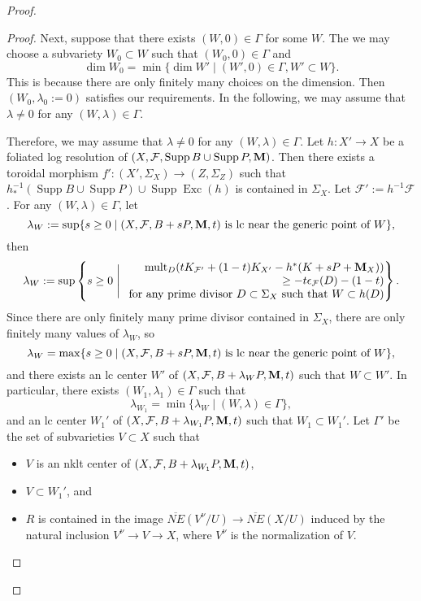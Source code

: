 \documentclass[12pt]{amsart}
\numberwithin{equation}{section}
\newcommand{\Mm}{{\bf{M}}}
\newcommand{\Exc}{\operatorname{Exc}}
\newcommand{\Supp}{\operatorname{Supp}}
\newcommand{\mult}{\operatorname{mult}}
\newcommand{\Ff}{\mathcal{F}}
\newcommand{\Ii}{\Gamma}
\theoremstyle{definition}
\theoremstyle{definition}
\theoremstyle{definition}
\begin{document}
\begin{proof}
\begin{proof}
    Next, suppose that there exists $(W,0)\in\Ii$ for some $W$. The we may choose a subvariety $W_0\subset W$ such that $(W_0,0)\in\Ii$ and
    $$\dim W_0=\min\{\dim W'\mid (W',0)\in\Ii, W'\subset W\}.$$
    This is because there are only finitely many choices on the dimension. Then $(W_0,\lambda_0:=0)$ satisfies our requirements. In the following, we may assume that $\lambda\not=0$ for any $(W,\lambda)\in\Ii$.

    Therefore, we may assume that $\lambda\not=0$ for any $(W,\lambda)\in\Ii$. Let $h: X'\rightarrow X$ be a foliated log resolution of $(X,\Ff,\Supp B\cup\Supp P,\Mm)$. Then there exists a toroidal morphism $f': (X',\Sigma_X)\rightarrow (Z,\Sigma_Z)$ such that $h^{-1}_\ast (\Supp B\cup\Supp P)\cup\Supp\Exc(h)$ is contained in $\Sigma_X$. Let $\Ff':=h^{-1}\Ff$. For any $(W,\lambda)\in\Ii$, let $$\lambda_W:=\sup\{s\geq 0\mid (X,\Ff,B+sP,\Mm,t)\text{ is lc near the generic point of }W\},$$
    then 
\begin{align*}
\lambda_W:=\sup\left\{s\geq 0\Biggm|
    \begin{array}{r@{}l}
        \mult_D(tK_{\Ff'}+(1-t)K_{X'}-h^\ast (K+sP+\Mm_X))\\ \geq -t\epsilon_{\Ff}(D)-(1-t)\\
        \text{for any prime divisor }D\subset\Sigma_{X}\text{ such that }W\subset h(D)
    \end{array}\right\}.
    \end{align*}
    Since there are only finitely many prime divisor contained in $\Sigma_X$, there are only finitely many values of $\lambda_W$, so
    $$\lambda_W=\max\{s\geq 0\mid (X,\Ff,B+sP,\Mm,t)\text{ is lc near the generic point of }W\},$$
    and there exists an lc center $W'$ of $(X,\Ff,B+\lambda_WP,\Mm,t)$ such that $W\subset W'$. In particular, there exists $(W_1,\lambda_1)\in\Ii$ such that 
    $$\lambda_{W_1}=\min\{\lambda_W\mid (W,\lambda)\in\Ii\},$$
and an lc center $W_1'$ of $(X,\Ff,B+\lambda_{W_1}P,\Mm,t)$ such that $W_1\subset W_1'$. Let $\Ii'$ be the set of subvarieties $V\subset X$ such that
\begin{itemize}
    \item $V$ is an nklt center of $(X,\Ff,B+\lambda_{W_1}P,\Mm,t)$,
    \item $V\subset W_1'$, and
    \item  $R$ is contained in the image $\overline{NE}(V^\nu/U)\rightarrow\overline{NE}(X/U)$ induced by the natural inclusion $V^\nu\rightarrow V\rightarrow X$, where $V^\nu$ is the normalization of $V$.
\end{itemize}

\end{proof}
\end{proof}
\end{document}
